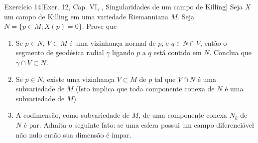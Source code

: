 \begin{thing4}{Exercício 14}[Exer. 12, Cap. VI, \cite{doc}, Singularidades de um campo de Killing]\label{exer:14}\leavevmode
Seja \(X\) um campo de Killing em uma variedade Riemanniana \(M\). Seja \(N=\{p \in M; X(p)=0\}\). Prove que
\begin{enumerate}[label=(\alph*)]
\item Se \(p \in N\), \(V \subset M\) é uma vizinhança normal de \(p\), e \(q \in N \cap V\), então o segmento de geodésica radial \(\gamma\) ligando \(p\) a \(q\) está contido em \(N\). Conclua que \(\gamma \cap V \subset N\).
\item Se \(p \in N\), existe uma vizinhança \(V \subset M\) de \(p\) tal que \(V \cap N\) é uma subvariedade de \(M\) (Isto implica que toda componente conexa de \(N\) é uma subvariedade de \(M\)).
\item A codimensão, como subvariedade de \(M\), de uma componente conexa \(N_k\) de \(N\) é par. Admita o seguinte fato: se uma esfera possui um campo diferenciável não nulo então sua dimensão é ímpar.
\end{enumerate}
\end{thing4}

